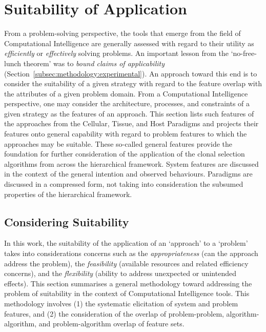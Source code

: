 \section{Suitability of Application}
\label{sec:iidle:suitability}
From a problem-solving perspective, the tools that emerge from the field of Computational Intelligence are generally assessed with regard to their utility as \emph{efficiently} or \emph{effectively} solving problems.
An important lesson from the `no-free-lunch theorem' was to \emph{bound claims of applicability} (Section~\ref{subsec:methodology:experimental}). An approach toward this end is to consider the suitability of a given strategy with regard to the feature overlap with the attributes of a given problem domain. From a Computational Intelligence perspective, one may consider the architecture, processes, and constraints of a given strategy as the features of an approach. 
This section lists such features of the approaches from the Cellular, Tissue, and Host Paradigms and projects their features onto general capability with regard to problem features to which the approaches may be suitable. These so-called general features provide the foundation for further consideration of the application of the clonal selection algorithms from across the hierarchical framework. System features are discussed in the context of the general intention and observed behaviours. Paradigms are discussed in a compressed form, not taking into consideration the subsumed properties of the hierarchical framework.

%
% 
\subsection{Considering Suitability}
\label{sec:iidle:suitability:framework}
In this work, the suitability of the application of an `approach' to a `problem' takes into considerations concerns such as the \emph{appropriateness} (can the approach address the problem), the \emph{feasibility} (available resources and related efficiency concerns), and the \emph{flexibility} (ability to address unexpected or unintended effects).
This section summarises a general methodology toward addressing the problem of suitability in the context of Computational Intelligence tools. This methodology involves (1) the systematic elicitation of system and problem features, and (2) the consideration of the overlap of problem-problem, algorithm-algorithm, and problem-algorithm overlap of feature sets. 

